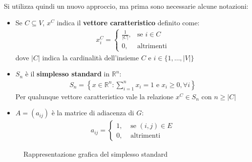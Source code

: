 Si utilizza quindi un nuovo approccio, ma prima sono necessarie alcune notazioni:
\begin{itemize}
    \item Se $C \subseteq V$, $x^C$ indica il \textbf{vettore caratteristico} definito come:
    \begin{align*}
        x^C_i = 
        \begin{cases}
            \displaystyle\frac{1}{|C|}, &\text{se }i \in C\\
            0,  &\text {altrimenti}
        \end{cases}
    \end{align*}
    dove $|C|$ indica la cardinalità dell'insieme $C$ e $i \in \{ 1, \dots, |V|\}$
    \item $S_n$ è il \textbf{simplesso standard} in $\mathbb{R}^n$:
    \begin{align*}
        S_n = \left\{x \in \mathbb{R}^n : \sum_{i=1}^n x_i = 1 \text{ e } x_i \geq 0, \forall i \right\}
    \end{align*}
    Per qualunque vettore caratteristico vale la relazione $x^C \in S_n$ con $n \geq |C|$
    \item $A=(a_{ij})$ è la matrice di adiacenza di $G$:
    \begin{align*}
        a_{ij} =
        \begin{cases}
            1, &\text{ se } (i,j) \in E \\
            0, &\text{ altrimenti}
        \end{cases}
    \end{align*}
\end{itemize}


\newpage

\begin{figure}[h!]
    \centering
    \caption{Rappresentazione grafica del simplesso standard}
\end{figure}

